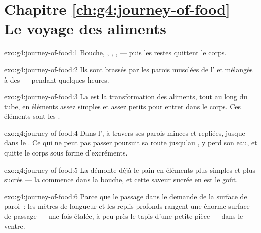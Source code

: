 \section*{Chapitre \ref{ch:g4:journey-of-food} --- Le voyage des aliments}

\begin{solution}{exo:g4:journey-of-food:1}
Bouche, , , ,  --- puis
les restes quittent le corps.
\end{solution}

\begin{solution}{exo:g4:journey-of-food:2}
Ils sont brassés par les parois musclées de l' et mélangés à
des  --- pendant quelques heures.
\end{solution}

\begin{solution}{exo:g4:journey-of-food:3}
La  est la transformation des aliments, tout au long du
tube, en éléments assez simples et assez petits pour entrer dans le
corps. Ces éléments sont les .
\end{solution}

\begin{solution}{exo:g4:journey-of-food:4}
Dans l', à travers ses parois minces et repliées,
jusque dans le . Ce qui ne peut pas passer poursuit sa route
jusqu'au , y perd son eau, et quitte le corps sous
forme d'excréments.
\end{solution}

\begin{solution}{exo:g4:journey-of-food:5}
La  démonte déjà le pain en éléments plus simples et plus
sucrés --- la  commence dans la bouche, et cette saveur
sucrée en est le goût.
\end{solution}

\begin{solution}{exo:g4:journey-of-food:6}
Parce que le passage dans le  demande de la surface de paroi~:
les mètres de longueur et les replis profonds rangent une énorme
surface de passage --- une fois étalée, à peu près le tapis d'une
petite pièce --- dans le ventre.
\end{solution}

